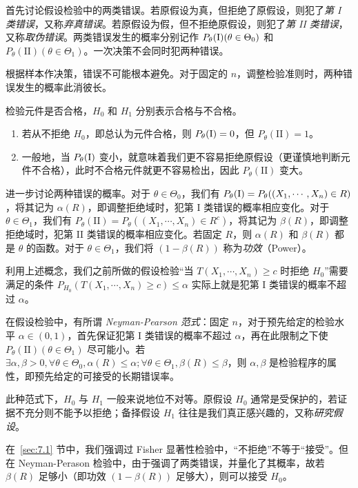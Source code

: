 \documentclass[../main.tex]{subfiles}
\begin{document}
首先讨论假设检验中的两类错误。若原假设为真，但拒绝了原假设，则犯了\emph{第 I 类错误}，又称\emph{弃真错误}。若原假设为假，但不拒绝原假设，则犯了\emph{第 II 类错误}，又称\emph{取伪错误}。两类错误发生的概率分别记作 $P_\theta(\text I)(\theta\in\Theta_0)$ 和 $P_\theta(\text{II})(\theta\in\Theta_1)$。一次决策不会同时犯两种错误。

根据样本作决策，错误不可能根本避免。对于固定的 $n$，调整检验准则时，两种错误发生的概率此消彼长。

\begin{example}
    检验元件是否合格，$H_0$ 和 $H_1$ 分别表示合格与不合格。
    \begin{enumerate}
        \item 若从不拒绝 $H_0$，即总认为元件合格，则 $P_\theta(\text I)=0$，但 $P_\theta(\text{II})=1$。
        \item 一般地，当 $P_\theta(\text I)$ 变小，就意味着我们更不容易拒绝原假设（更谨慎地判断元件不合格），此时不合格元件就更不容易检出，因此 $P_\theta(\text{II})$ 变大。
    \end{enumerate}
\end{example}

进一步讨论两种错误的概率。对于 $\theta\in\Theta_0$，我们有 $P_\theta(\text I)=P_\theta((X_1,\cdots,X_n)\in R)$，将其记为 $\alpha(R)$，即调整拒绝域时，犯第 I 类错误的概率相应变化。对于 $\theta\in\Theta_1$，我们有 $P_\theta(\text{II})=P_\theta((X_1,\cdots,X_n)\in R^c)$，将其记为 $\beta(R)$，即调整拒绝域时，犯第 II 类错误的概率相应变化。若固定 $R$，则 $\alpha(R)$ 和 $\beta(R)$ 都是 $\theta$ 的函数。对于 $\theta\in\Theta_1$，我们将 $(1-\beta(R))$ 称为\emph{功效}（Power）。

利用上述概念，我们之前所做的假设检验“当 $T(X_1,\cdots,X_n)\geq c$ 时拒绝 $H_0$”需要满足的条件 $P_{H_0}(T(X_1,\cdots,X_n)\geq c)\leq\alpha$ 实际上就是犯第 I 类错误的概率不超过 $\alpha$。

在假设检验中，有所谓 \emph{Neyman-Pearson 范式}：固定 $n$，对于预先给定的检验水平 $\alpha\in(0,1)$，首先保证犯第 I 类错误的概率不超过 $\alpha$，再在此限制之下使 $P_\theta(\text{II})(\theta\in\Theta_1)$ 尽可能小。若 $\exists\alpha,\beta>0,\forall\theta\in\Theta_0,\alpha(R)\leq\alpha;\forall\theta\in\Theta_1,\beta(R)\leq\beta$，则 $\alpha,\beta$ 是检验程序的属性，即预先给定的可接受的长期错误率。

此种范式下，$H_0$ 与 $H_1$ 一般来说地位不对等。原假设 $H_0$ 通常是受保护的，若证据不充分则不能予以拒绝；备择假设 $H_1$ 往往是我们真正感兴趣的，又称\emph{研究假设}。

在~\ref{sec:7.1} 节中，我们强调过 Fisher 显著性检验中，“不拒绝”不等于“接受”。但在 Neyman-Perason 检验中，由于强调了两类错误，并量化了其概率，故若 $\beta(R)$ 足够小（即功效 $(1-\beta(R))$ 足够大），则可以接受 $H_0$。
\end{document}
